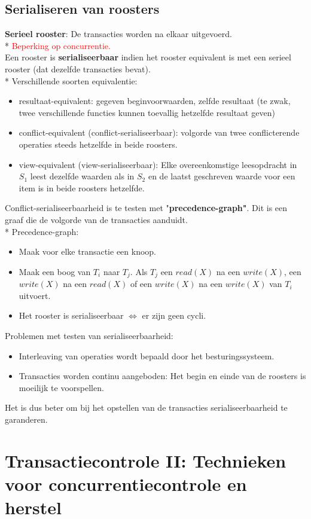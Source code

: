\documentclass[10pt]{article}
\begin{document}
\subsection{Serialiseren van roosters}
\textbf{Serieel rooster}: De transacties worden na elkaar uitgevoerd.\\*
\textcolor{red}{Beperking op concurrentie.}\\
Een rooster is \textbf{serialiseerbaar} indien het rooster equivalent is met een serieel rooster (dat dezelfde transacties bevat).\\*
Verschillende soorten equivalentie:
\begin{itemize}
\item resultaat-equivalent: gegeven beginvoorwaarden, zelfde resultaat (te zwak, twee verschillende functies kunnen toevallig hetzelfde resultaat geven)
\item conflict-equivalent (conflict-serialiseerbaar): volgorde van twee conflicterende operaties steeds hetzelfde in beide roosters.
\item view-equivalent (view-serialiseerbaar): Elke overeenkomstige leesopdracht in $S_1$ leest dezelfde waarden als in $S_2$ en de laatst geschreven waarde voor een item is in beide roosters hetzelfde.
\end{itemize}
Conflict-serialiseerbaarheid is te testen met "\textbf{precedence-graph"}. Dit is een graaf die de volgorde van de transacties aanduidt.\\*
Precedence-graph:
\begin{itemize}
\item Maak voor elke transactie een knoop.
\item Maak een boog van $T_i$ naar $T_j$. Als $T_j$ een $read(X)$ na een $write(X)$, een $write(X)$ na een $read(X)$ of een $write(X)$ na een $write(X)$ van $T_i$ uitvoert.
\item Het rooster is serialiseerbaar $\Leftrightarrow$ er zijn geen cycli.
\end{itemize}
Problemen met testen van serialiseerbaarheid:
\begin{itemize}
\item Interleaving van operaties wordt bepaald door het besturingssysteem.
\item Transacties worden continu aangeboden: Het begin en einde van de roosters is moeilijk te voorspellen.
\end{itemize}
Het is dus beter om bij het opstellen van de transacties serialiseerbaarheid te garanderen.
\section{Transactiecontrole II: Technieken voor concurrentiecontrole en herstel}
\end{document}
